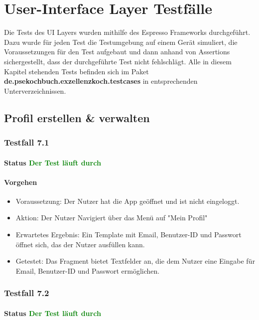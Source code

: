 \chapter{User-Interface Layer Testfälle}
Die Tests des UI Layers wurden mithilfe des Espresso Frameworks durchgeführt. Dazu wurde für jeden Test die Testumgebung auf einem Gerät simuliert, die Voraussetzungen für den Test aufgebaut und dann anhand von Assertions sichergestellt, dass der durchgeführte Test nicht fehlschlägt.
Alle in diesem Kapitel stehenden Tests befinden sich im Paket \textbf{de.psekochbuch.exzellenzkoch.testcases} in entsprechenden Unterverzeichnissen.

\section{Profil erstellen \& verwalten}

\subsection{Testfall 7.1}
\subsubsection{Status \textcolor{green}{ Der Test läuft durch}}
\subsubsection{Vorgehen}
\begin{itemize}
\item Voraussetzung: Der Nutzer hat die App geöffnet und ist nicht eingeloggt.
\item Aktion: Der Nutzer Navigiert über das Menü auf "Mein Profil"
\item Erwartetes Ergebnis: Ein Template mit Email, Benutzer-ID und Passwort öffnet sich, das der Nutzer ausfüllen kann.
\item Getestet: Das Fragment bietet Textfelder an, die dem Nutzer eine Eingabe für Email, Benutzer-ID und Passwort ermöglichen.
\end{itemize}


\subsection{Testfall 7.2}
\subsubsection{Status \textcolor{green}{ Der Test läuft durch}}
